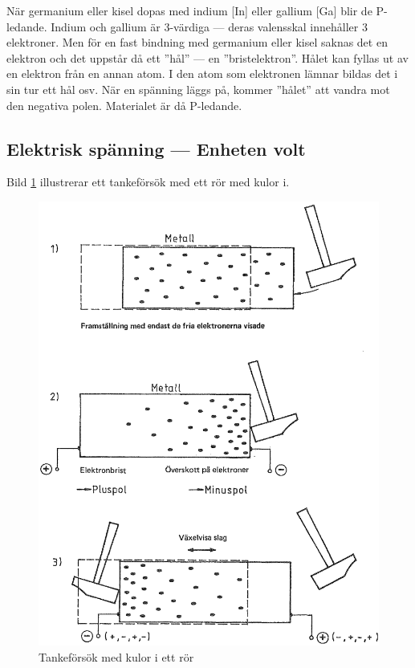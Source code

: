När germanium eller kisel dopas med indium [In] eller gallium [Ga] blir de
P-ledande.
Indium och gallium är 3-värdiga --- deras valensskal innehåller 3 elektroner.
Men för en fast bindning med germanium eller kisel saknas det en elektron och
det uppstår då ett ''hål'' --- en ''bristelektron''.
Hålet kan fyllas ut av en elektron från en annan atom.
I den atom som elektronen lämnar bildas det i sin tur ett hål osv.
När en spänning läggs på, kommer ''hålet'' att vandra mot den negativa polen.
Materialet är då P-ledande.

\subsection{Elektrisk spänning --- Enheten volt}

Bild \ref{fig:BildII1-2} illustrerar ett tankeförsök med ett rör med kulor i. 

\begin{figure}
\begin{center}
\includegraphics[width=\textwidth]{images/cropped_pdfs/bild_2_1-02.pdf}
\caption{Tankeförsök med kulor i ett rör}
\label{fig:BildII1-2}
\end{center}
\end{figure}

